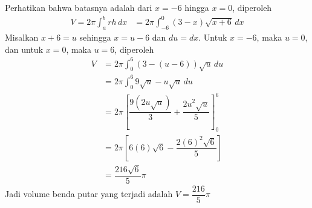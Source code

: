 \documentclass{article}
\begin{document}
\begin{enumerate}
		Perhatikan bahwa batasnya adalah dari $x=-6$ hingga $x=0$, diperoleh 
		\begin{align*}
		V = 2\pi \int_a^b rh\, dx &= 2\pi \int_{-6}^0 (3-x)\sqrt{x+6}\, dx
		\end{align*}
		Misalkan $x+6=u$ sehingga $x=u-6$ dan $du=dx$. Untuk $x=-6$, maka $u=0$, dan untuk $x=0$, maka $u=6$, diperoleh
		\begin{align*}
		V &= 2\pi \int_0^6 (3-(u-6))\sqrt{u}\, du\\
		&= 2\pi\int_0^6 9\sqrt{u} - u\sqrt{u}\, du\\
		&= 2\pi \left[\dfrac{9(2u\sqrt{u})}{3}+\dfrac{2u^2\sqrt{u}}{5}\right]^6_0\\
		&= 2\pi \left[6(6)\sqrt{6}-\dfrac{2(6)^2\sqrt{6}}{5}\right]\\
		&= \dfrac{216\sqrt{6}}{5}\pi
		\end{align*}
		Jadi volume benda putar yang terjadi adalah $V=\dfrac{216}{5}\pi$
\end{enumerate}
\end{document}
